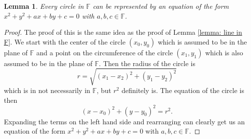 \documentclass[11pt]{article}
\newtheorem{lemma}[theorem]{Lemma}
\theoremstyle{definition}
\begin{document}
\begin{lemma}
  Every circle in $\mathbb{F}$ can be represented by an equation of the form $x^2 + y^2 + ax + by +c = 0$ with $a,b,c\in\mathbb{F}$.
  \label{lemma: circle in F}
\end{lemma}
\begin{proof}
  The proof of this is the same idea as the proof of Lemma \ref{lemma: line in F}. We start with the center of the circle $(x_0,y_0)$ which is
  assumed to be in the plane of $\mathbb{F}$ and a point on the circumference of the circle $(x_1,y_1)$ which is also assumed to be in the 
  plane of $\mathbb{F}$. Then the radius of the circle is
  \[ r = \sqrt{(x_1-x_2)^2 + (y_1-y_2)^2}\]
  which is in not necessarily in $\mathbb{F}$, but $r^2$ definitely is. The equation of the circle is then
  \[ (x-x_0)^2 + (y-y_0)^2 = r^2.\]
  Expanding the terms on the left hand side and rearranging can clearly get us an equation of the form $x^2 + y^2 + ax + by +c = 0$ with $a,b,c\in\mathbb{F}$.
\end{proof}
\end{document}
